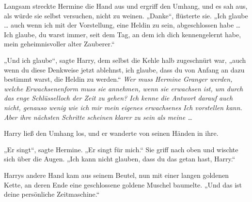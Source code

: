 Langsam streckte Hermine die Hand aus und ergriff den Umhang, und es sah aus, als würde sie selbst versuchen, nicht zu weinen.
„Danke“, flüsterte sie.
„Ich glaube … auch wenn ich mit der Vorstellung, eine Heldin zu sein, abgeschlossen habe … Ich glaube, du warst immer, seit dem Tag, an dem ich dich kennengelernt habe, mein geheimnisvoller alter Zauberer.“

„Und ich glaube“, sagte Harry, dem selbst die Kehle halb zugeschnürt war, „auch wenn du diese Denkweise jetzt ablehnst, ich glaube, dass du von Anfang an dazu bestimmt warst, die Heldin zu werden.“
\emph{Wer muss Hermine Granger werden, welche Erwachsenenform muss sie annehmen, wenn sie erwachsen ist, um durch das enge Schlüsselloch der Zeit zu gehen? Ich kenne die Antwort darauf auch nicht, genauso wenig wie ich mir mein eigenes erwachsenes Ich vorstellen kann. Aber ihre nächsten Schritte scheinen klarer zu sein als meine …}

Harry ließ den Umhang los, und er wanderte von seinen Händen in ihre.

„Er singt“, sagte Hermine.
„Er singt für mich.“ Sie griff nach oben und wischte sich über die Augen.
„Ich kann nicht glauben, dass du das getan hast, Harry.“

Harrys andere Hand kam aus seinem Beutel, nun mit einer langen goldenen Kette, an deren Ende eine geschlossene goldene Muschel baumelte.
„Und das ist deine persönliche Zeitmaschine.“

